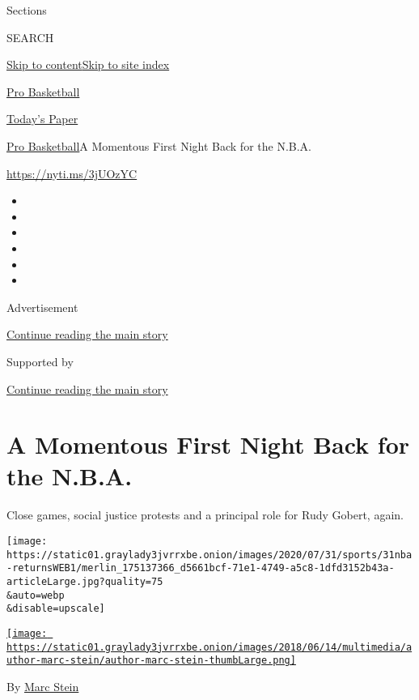 Sections

SEARCH

\protect\hyperlink{site-content}{Skip to
content}\protect\hyperlink{site-index}{Skip to site index}

\href{https://www.nytimes3xbfgragh.onion/section/sports/basketball}{Pro
Basketball}

\href{https://myaccount.nytimes3xbfgragh.onion/auth/login?response_type=cookie\&client_id=vi}{}

\href{https://www.nytimes3xbfgragh.onion/section/todayspaper}{Today's
Paper}

\href{/section/sports/basketball}{Pro Basketball}\textbar{}A Momentous
First Night Back for the N.B.A.

\url{https://nyti.ms/3jUOzYC}

\begin{itemize}
\item
\item
\item
\item
\item
\item
\end{itemize}

Advertisement

\protect\hyperlink{after-top}{Continue reading the main story}

Supported by

\protect\hyperlink{after-sponsor}{Continue reading the main story}

\hypertarget{a-momentous-first-night-back-for-the-nba}{%
\section{A Momentous First Night Back for the
N.B.A.}\label{a-momentous-first-night-back-for-the-nba}}

Close games, social justice protests and a principal role for Rudy
Gobert, again.

\texttt{[image: https://static01.graylady3jvrrxbe.onion/images/2020/07/31/sports/31nba-returnsWEB1/merlin\_175137366\_d5661bcf-71e1-4749-a5c8-1dfd3152b43a-articleLarge.jpg?quality=75\\\&auto=webp\\\&disable=upscale]}

\href{https://www.nytimes3xbfgragh.onion/by/marc-stein}{\texttt{[image: https://static01.graylady3jvrrxbe.onion/images/2018/06/14/multimedia/author-marc-stein/author-marc-stein-thumbLarge.png]}}

By \href{https://www.nytimes3xbfgragh.onion/by/marc-stein}{Marc Stein}

